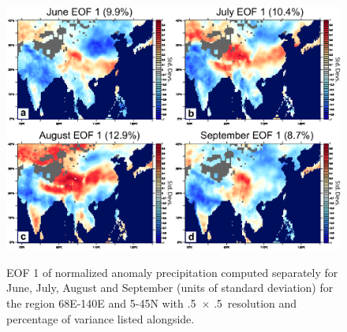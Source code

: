 \documentclass[12pt]{article}
\begin{document}
\begin{figure}[t]
  \noindent\includegraphics[width=36pc,angle=0]{fig6eof_monthly}\\
  \caption{EOF 1 of normalized anomaly precipitation computed separately for June, July, August and September (units of standard deviation) for the region 68E-140E and 5-45N with .5\textdegree\ $\times$ .5\textdegree\ resolution and percentage of variance listed alongside.}\label{f6}
\end{figure}
\end{document}
